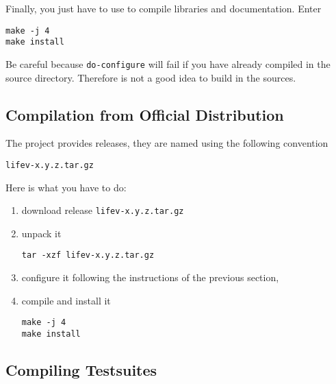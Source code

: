 %
%


\noindent Finally, you just have to use  to compile \lifev libraries and documentation.
Enter
\begin{verbatim}
make -j 4
make install
\end{verbatim}

\noindent Be careful because \verb!do-configure! will fail if you have already compiled
\lifev in the source directory. Therefore is not a good idea to build in the sources.

\subsection{Compilation from Official Distribution}
\label{sec:comp-from-offic}
The \lifev project provides releases, they are named using the following convention
\begin{center}
\verb!lifev-x.y.z.tar.gz!
\end{center}

Here is what you have to do:

\begin{enumerate}
\item download \lifev release \verb!lifev-x.y.z.tar.gz!
\item unpack it
\begin{verbatim}
tar -xzf lifev-x.y.z.tar.gz
\end{verbatim}
\item configure it following the instructions of the previous section,
\item compile and install it
\begin{verbatim}
make -j 4
make install
\end{verbatim}
\end{enumerate}


\subsection{Compiling Testsuites}

